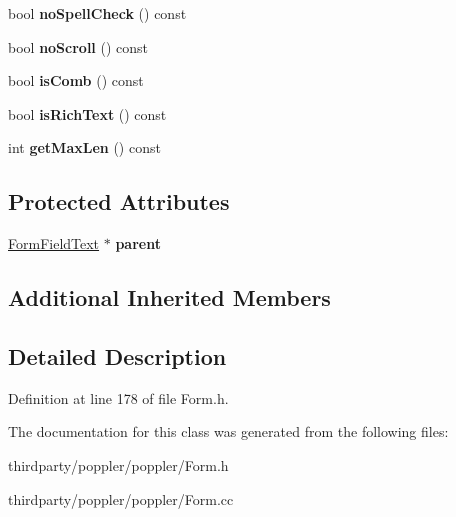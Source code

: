 \begin{DoxyCompactItemize}
bool {\bfseries no\+Spell\+Check} () const
\item 
\mbox{\label{class_form_widget_text_ad0ce04cff01fa6b9e9e682feed081166}} 
bool {\bfseries no\+Scroll} () const
\item 
\mbox{\label{class_form_widget_text_a301a7a8f8875fc8b76b37c30d6f696d1}} 
bool {\bfseries is\+Comb} () const
\item 
\mbox{\label{class_form_widget_text_a7cb4d56a5ec93addf69804f40218bf15}} 
bool {\bfseries is\+Rich\+Text} () const
\item 
\mbox{\label{class_form_widget_text_a7a4579900753c452b2193d59714d4e01}} 
int {\bfseries get\+Max\+Len} () const
\end{DoxyCompactItemize}
\subsection*{Protected Attributes}
\begin{DoxyCompactItemize}
\item 
\mbox{\label{class_form_widget_text_acaae162dd631d2e8ec6e582e021aa141}} 
\hyperlink{class_form_field_text}{Form\+Field\+Text} $\ast$ {\bfseries parent}
\end{DoxyCompactItemize}
\subsection*{Additional Inherited Members}


\subsection{Detailed Description}


Definition at line 178 of file Form.\+h.



The documentation for this class was generated from the following files\+:\begin{DoxyCompactItemize}
\item 
thirdparty/poppler/poppler/Form.\+h\item 
thirdparty/poppler/poppler/Form.\+cc\end{DoxyCompactItemize}
